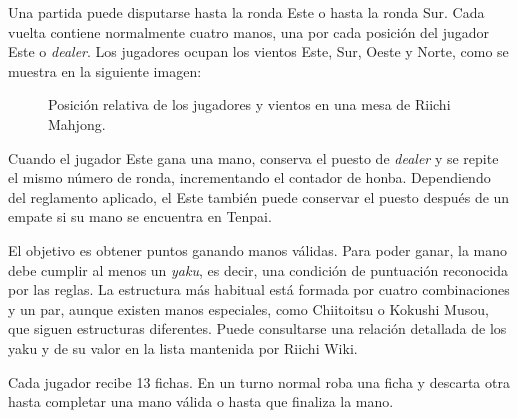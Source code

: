 Una partida puede disputarse hasta la ronda Este o hasta la ronda Sur. Cada vuelta contiene normalmente cuatro manos, una por cada posición del jugador Este o \textit{dealer}. Los jugadores ocupan los vientos Este, Sur, Oeste y Norte, como se muestra en la siguiente imagen:

\begin{figure}[H]
\centering


\caption{
Posición relativa de los jugadores y vientos en una mesa de Riichi Mahjong.
}

\label{fig:winds_table}

\end{figure}

Cuando el jugador Este gana una mano, conserva el puesto de \textit{dealer} y se repite el mismo número de ronda, incrementando el contador de honba. Dependiendo del reglamento aplicado, el Este también puede conservar el puesto después de un empate si su mano se encuentra en Tenpai.

El objetivo es obtener puntos ganando manos válidas. Para poder ganar, la mano debe cumplir al menos un \label{txt:Yaku}\textit{yaku}, es decir, una condición de puntuación reconocida por las reglas. La estructura más habitual está formada por cuatro combinaciones y un par, aunque existen manos especiales, como Chiitoitsu o Kokushi Musou, que siguen estructuras diferentes. Puede consultarse una relación detallada de los yaku y de su valor en la lista mantenida por Riichi Wiki\cite{riichiWikiYakuList}.


Cada jugador recibe 13 fichas. En un turno normal roba una ficha y descarta otra hasta completar una mano válida o hasta que finaliza la mano.


